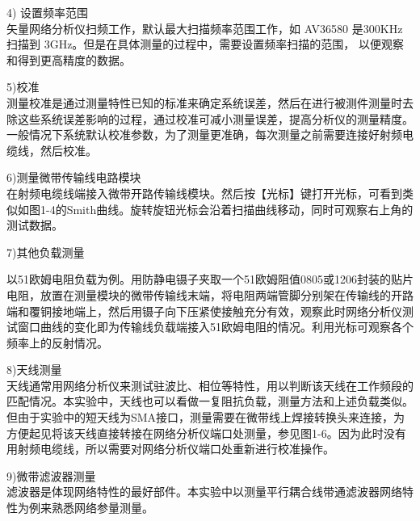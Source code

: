 \documentclass[12pt,hyperref,a4paper,UTF8]{ctexart}
\begin{document}
4) 设置频率范围\\
矢量网络分析仪扫频工作，默认最大扫描频率范围工作，如 AV36580 是300KHz 扫描到 3GHz。但是在具体测量的过程中，需要设置频率扫描的范围， 以便观察和得到更高精度的数据。


5)校准\\
测量校准是通过测量特性已知的标准来确定系统误差，然后在进行被测件测量时去除这些系统误差影响的过程，通过校准可减小测量误差，提高分析仪的测量精度。\\
一般情况下系统默认校准参数，为了测量更准确，每次测量之前需要连接好射频电缆线，然后校准。

6)测量微带传输线电路模块\\
在射频电缆线端接入微带开路传输线模块。然后按【光标】键打开光标，可看到类似如图1-4的Smith曲线。旋转旋钮光标会沿着扫描曲线移动，同时可观察右上角的测试数据。

7)其他负载测量

以51欧姆电阻负载为例。用防静电镊子夹取一个51欧姆阻值0805或1206封装的贴片电阻，放置在测量模块的微带传输线末端，将电阻两端管脚分别架在传输线的开路端和覆铜接地端上，然后用镊子向下压紧使接触充分有效，观察此时网络分析仪测试窗口曲线的变化即为传输线负载端接入51欧姆电阻的情况。利用光标可观察各个频率上的反射情况。

8)天线测量\\
天线通常用网络分析仪来测试驻波比、相位等特性，用以判断该天线在工作频段的匹配情况。本实验中，天线也可以看做一复阻抗负载，测量方法和上述负载类似。但由于实验中的短天线为SMA接口，测量需要在微带线上焊接转换头来连接，为方便起见将该天线直接转接在网络分析仪端口处测量，参见图1-6。因为此时没有用射频电缆线，所以需要对网络分析仪端口处重新进行校准操作。

9)微带滤波器测量\\
滤波器是体现网络特性的最好部件。本实验中以测量平行耦合线带通滤波器网络特性为例来熟悉网络参量测量。


\end{document}
